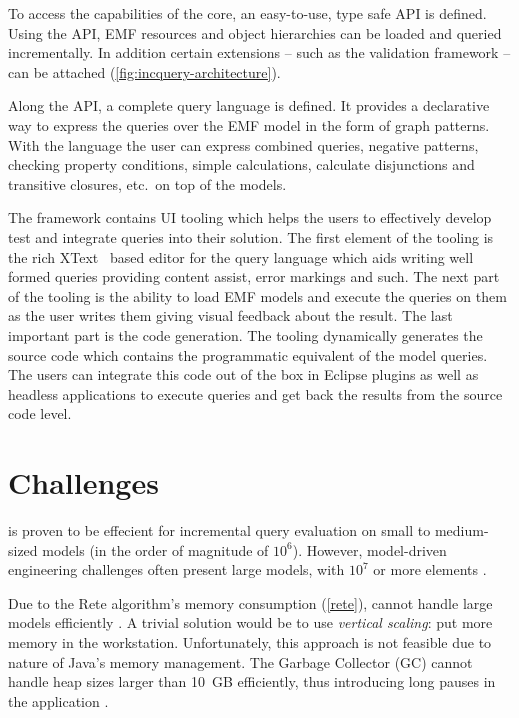 To access the capabilities of the core, an easy-to-use, type safe API is
defined. Using the API, EMF resources and object hierarchies can be loaded and
queried incrementally. In addition certain extensions -- such as the validation
framework -- can be attached (\autoref{fig:incquery-architecture}).

Along the API, a complete query language is defined. It provides a declarative
way to express the queries over the EMF model in the form of graph patterns.
With the language the user can express combined queries, negative patterns,
checking property conditions, simple calculations, calculate disjunctions and
transitive closures, etc.~on top of the models.

The framework contains UI tooling which helps the users to effectively develop
test and integrate queries into their solution. The first element of the tooling
is the rich XText~\cite{XtextWeb} based editor for the query language which aids writing well
formed queries providing content assist, error markings and such. The next part
of the tooling is the ability to load EMF models and execute the queries on them
as the user writes them giving visual feedback about the result.
The last important part is the code generation. The tooling dynamically
generates the source code which contains the programmatic equivalent of the
model queries. The users can integrate this code out of the box in Eclipse
plugins as well as headless applications to execute queries and get back the
results from the source code level.

\section{Challenges}

\eiq{} is proven to be effecient for incremental query evaluation on small to medium-sized models (in the order of magnitude of $10^6$). However, model-driven engineering challenges often present large models, with $10^7$ or more elements \cite{Scheidgen12}. 

Due to the Rete algorithm's memory consumption (\autoref{rete}), \eiq{} cannot handle large models efficiently \cite{models10}. A trivial solution would be to use \emph{vertical scaling}: put more memory in the workstation. Unfortunately, this approach is not feasible due to nature of Java's memory management. The Garbage Collector (GC) cannot handle heap sizes larger than 10~GB efficiently, thus introducing long pauses in the application \cite{Azul}. 

